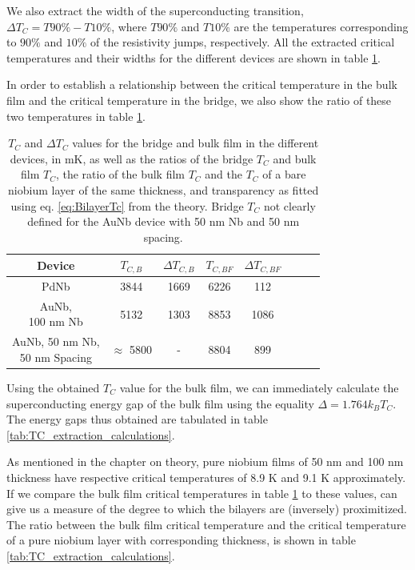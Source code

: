 We also extract the width of the superconducting transition, $\Delta T_C = T90\% - T10\% $, where $T90\% $ and $T10\% $ are the temperatures corresponding to $90\% $ and $10\% $ of the resistivity jumps, respectively. All the extracted critical temperatures and their widths for the different devices are shown in table \ref{tab:TC_extraction}.



In order to establish a relationship between the critical temperature in the bulk film and the critical temperature in the bridge, we also show the ratio of these two temperatures in table \ref{tab:TC_extraction}. 

\begin{table}[H]
\caption{$T_C$ and $\Delta T_C$ values for the bridge and bulk film in the different devices, in mK, as well as the ratios of the bridge $T_C$ and bulk film $T_C$, the ratio of the bulk film $T_C$ and the $T_C$ of a bare niobium layer of the same thickness, and transparency as fitted using eq. \ref{eq:BilayerTc} from the theory. Bridge $T_C$ not clearly defined for the AuNb device with 50 nm Nb and 50 nm spacing.}
\label{tab:TC_extraction}
\centering
\begin{tabular}{|c|c|c|c|c|c|c|c|}
\hline 
Device & $T_{C, B}$ & $\Delta T_{C, B}$ & $T_{C, BF}$  & $\Delta T_{C, BF}$ \\ 
\hline 
PdNb & 3844 & 1669 & 6226 & 112 \\ 
\hline 
\makecell{AuNb, \\ 100 nm Nb} & 5132 & 1303 & 8853 & 1086 \\ 
\hline 
\makecell{AuNb, 50 nm Nb, \\ 50 nm Spacing} & $\approx$ 5800 & - & 8804 & 899 \\ 
\hline 
\end{tabular} 

\end{table}

Using the obtained $T_C$ value for the bulk film, we can immediately calculate the superconducting energy gap of the bulk film using the equality $\Delta = 1.764k_BT_C$. The energy gaps thus obtained  are tabulated in table \ref{tab:TC_extraction_calculations}. 


As mentioned in the chapter on theory, pure niobium films of 50 nm and 100 nm thickness have respective critical temperatures of 8.9 K and 9.1 K approximately. If we compare the bulk film critical temperatures in table \ref{tab:TC_extraction} to these values, can give us a measure of the degree to which the bilayers are (inversely) proximitized. The ratio between the bulk film critical temperature and the critical temperature of a pure niobium layer with corresponding thickness, is shown in table \ref{tab:TC_extraction_calculations}.

